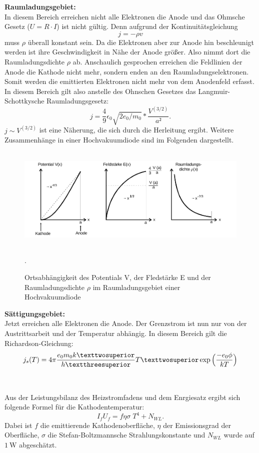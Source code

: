 \textbf{Raumladungsgebiet:}\\
In diesem Bereich erreichen nicht alle Elektronen die Anode und das Ohmsche Gesetz
($U=R\cdot I$) ist nicht gültig. Denn aufgrund der Kontinuitätsgleichung
\begin{equation}
  j=  -\rho v
\end{equation}
muss $\rho$ überall konstant sein. Da die Elektronen aber zur Anode hin beschleunigt werden
ist ihre Geschwindigkeit in Nähe der Anode größer. Also nimmt dort die Raumladungsdichte
$\rho$ ab. Anschaulich gesprochen erreichen die Feldlinien der Anode die Kathode nicht mehr,
sondern enden an den Raumladungselektronen. Somit werden die emittierten Elektronen
nicht mehr von dem Anodenfeld erfasst.
In diesem Bereich gilt also anstelle des Ohnschen Gesetzes das
Langmuir-Schottkysche Raumladungsgesetz:
\begin{equation}
  j=\frac{4}{9}\epsilon_{0}\sqrt{2e_{0}/m_{0}}*\frac{V^{(3/2)}}{a²}.
  \label{eqn:lang}
\end{equation}
$j \sim V^{(3/2)}$ ist eine Näherung, die sich durch die Herleitung ergibt.
 Weitere Zusammenhänge in einer Hochvakuumdiode sind im Folgenden dargestellt.
 \begin{figure}[H]
   \centering
   \includegraphics[height=5cm]{diagramm.png}
   \caption{Ortsabhängigkeit des Potentials V, der Fledstärke E und der Raumladungsdichte $\rho$
   im Raumladungsgebiet einer Hochvakuumdiode}
   \label{fig:diagramm}
   \cite{skript}.
 \end{figure}

\textbf{Sättigungsgebiet:}\\
Jetzt erreichen alle Elektronen die Anode. Der Grenzstrom ist nun nur von der
Austrittsarbeit und der Temperatur abhängig. In diesem Bereich gilt die
Richardson-Gleichung:
\begin{equation}
  j_{s}(T)= 4 \pi \frac{e_{0}m_{0}k²}{h³}T²\exp{\Bigl(\frac{-e_{0}\phi}{kT}\Bigr)}
  \label{eqn:satt}
\end{equation}
\\
\\


Aus der Leistungsbilanz des Heizstromfadens und dem Enrgiesatz ergibt sich folgende Formel
für die Kathodentemperatur:
\begin{equation}
  I_{f}U_{f}=f \eta \sigma\; T^{4}+N_{WL}.
  \label{temperatur}
\end{equation}
Dabei ist $f$ die emittierende Kathodenoberfläche, $\eta$ der Emissionsgrad der Oberfläche,
$\sigma$ die Stefan-Boltzmannsche Strahlungskonstante und $N_{WL}$ wurde auf $\SI{1}{\W}$
abgeschätzt.
\label{sec:Theorie}
